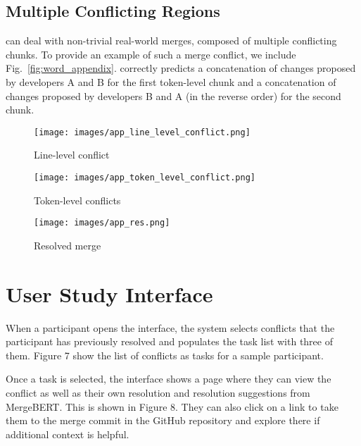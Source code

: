 \subsection{Multiple Conflicting Regions}
\label{sec:multiple_regions}

\thistool{} can deal with non-trivial real-world merges, composed of multiple conflicting chunks. To provide an example of such a merge conflict, we include Fig.~\ref{fig:word_appendix}.
\thistool{} correctly predicts a concatenation of changes proposed by developers A and B for the first token-level chunk and a concatenation of changes proposed by developers B and A (in the reverse order) for the second chunk.
\begin{figure*}
    \centering
    \begin{subfigure}[b]{0.5\textwidth}
        \texttt{[image: images/app\_line\_level\_conflict.png]}
        \caption{Line-level conflict}
        \label{fig:line-level-conflict-a}
    \end{subfigure}
    \begin{subfigure}[b]{0.5\textwidth}
        \texttt{[image: images/app\_token\_level\_conflict.png]}
        \caption{Token-level conflicts}
        \label{fig:token-level-conflict-a}
    \end{subfigure}
    \begin{subfigure}[b]{0.5\textwidth}
        \texttt{[image: images/app\_res.png]}
        \caption{Resolved merge}
        \label{fig:suggested-merge-res-b}
    \end{subfigure}
    \caption{Example real-world merge conflict resolved by \thistool{}. (Top) merge conflict represented through the standard \texttt{diff3}, (middle) corresponding token-level conflicts, and (bottom) the user resolution.}
    \label{fig:word_appendix}
\end{figure*}



\section{User Study Interface}

When a participant opens the interface, the system selects conflicts that the participant has previously resolved and populates the task list with three of them.  Figure 7 show the list of conflicts as tasks for a sample participant.

Once a task is selected, the interface shows a page where they can view the conflict as well as their own resolution and resolution suggestions from MergeBERT.  This is shown in Figure 8.  They can also click on a link to take them to the merge commit in the GitHub repository and explore there if additional context is helpful.

